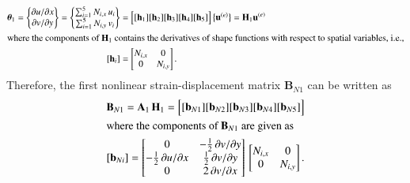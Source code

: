 \begin{subequations}
	\begin{align}
	\boldsymbol{\theta}_1 =  \begin{Bmatrix}
		\partial u / \partial x\\
		\partial v / \partial y
	\end{Bmatrix}
	= \begin{Bmatrix}
		\sum\nolimits_{i=1}^5 N_{i,x} \, u_i\\
		\sum\nolimits_{i=1}^5 N_{i,y} \, v_i
	\end{Bmatrix} 
	& = \begin{bmatrix}
		[\mathbf{h}_1] [\mathbf{h}_2] [\mathbf{h}_3] [\mathbf{h}_4] [\mathbf{h}_5] 
	\end{bmatrix} \bigl\{ \begin{matrix} \mathbf{u}^{(e)} \end{matrix} \bigr\} 
	= \mathbf{H}_1  \mathbf{u}^{(e)} \\
		\intertext{where the components of $\mathbf{H}_1$ contains the derivatives of shape functions with respect to spatial variables, i.e.,}
		[\mathbf{h}_i] & = \begin{bmatrix}
			N_{i,x} &  0  \\
			0 & N_{i,y}  \end{bmatrix} .
	\end{align}
\end{subequations}
Therefore, the first nonlinear strain-displacement matrix $\mathbf{B}_{N1}$ can be written as
\begin{subequations}
	\begin{align}
	\mathbf{B}_{N1} = \mathbf{A}_1 \, \mathbf{H}_1 = \begin{bmatrix}
		[\mathbf{b}_{N1}] [\mathbf{b}_{N2}] [\mathbf{b}_{N3}] [\mathbf{b}_{N4}] [\mathbf{b}_{N5}] 
	\end{bmatrix}  \\
		\intertext{where the components of $\mathbf{B}_{N1}$ are given as}
		[\mathbf{b}_{Ni}] = \begin{bmatrix}
			0 &  - \tfrac{1}{2} \, \partial v / \partial y \\
			-\tfrac{1}{2} \, \partial u / \partial x &  \tfrac{1}{2} \, \partial v / \partial y \\
			0  & 2 \, \partial v / \partial x  \end{bmatrix}  \, \begin{bmatrix}
			N_{i,x} &  0  \\
			0 & N_{i,y}  \end{bmatrix}.
	\end{align}
\end{subequations}

